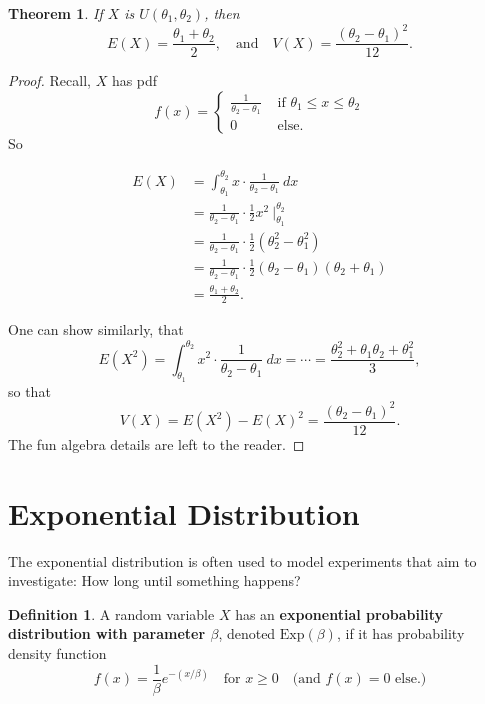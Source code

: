 \documentclass[
]{book}
\newtheorem{theorem}{Theorem}[chapter]
\theoremstyle{definition}
\newtheorem{definition}{Definition}[chapter]
\theoremstyle{definition}
\theoremstyle{definition}
\theoremstyle{definition}
\theoremstyle{remark}
\begin{document}
\begin{theorem}
\protect\hypertarget{thm:uniform-EandV}{}\label{thm:uniform-EandV}If \(X\) is \(U(\theta_1,\theta_2)\), then \[E(X) = \frac{\theta_1 + \theta_2}{2}, ~~~ \text{ and } ~~~ V(X) = \frac{(\theta_2-\theta_1)^2}{12}.\]
\end{theorem}

\begin{proof}
Recall, \(X\) has pdf
\[
f(x)=
\begin{cases}
\frac{1}{\theta_2 - \theta_1} &\text{ if }\theta_1 \leq x \leq \theta_2 \\
0 &\text{ else.} 
\end{cases}
\]
So

\begin{align*}
E(X) &= \int_{\theta_1}^{\theta_2} x \cdot \frac{1}{\theta_2-\theta_1}~dx\\
      &= \frac{1}{\theta_2-\theta_1} \cdot \frac{1}{2}x^2 ~\biggr|_{\theta_1}^{\theta_2}\\
      &= \frac{1}{\theta_2-\theta_1} \cdot \frac{1}{2}(\theta_2^2-\theta_1^2) \\
      &= \frac{1}{\theta_2-\theta_1} \cdot \frac{1}{2}(\theta_2-\theta_1)(\theta_2+\theta_1) \\
      &= \frac{\theta_1+\theta_2}{2}.
\end{align*}

One can show similarly, that \[E(X^2) = \int_{\theta_1}^{\theta_2} x^2 \cdot \frac{1}{\theta_2-\theta_1}~dx = \cdots =  \frac{\theta_2^2 + \theta_1\theta_2 + \theta_1^2}{3},\]
so that \[V(X) = E(X^2) - E(X)^2 = \frac{(\theta_2-\theta_1)^2}{12}.\] The fun algebra details are left to the reader.
\end{proof}

\section{Exponential Distribution}\label{exponential-distribution}

The exponential distribution is often used to model experiments that aim to investigate: How long until something happens?

\begin{definition}
\protect\hypertarget{def:exp-distribution}{}\label{def:exp-distribution}A random variable \(X\) has an \textbf{exponential probability distribution with parameter \(\beta\)}, denoted \(\text{Exp}(\beta)\), if it has probability density function
\[
f(x)=
\frac{1}{\beta}e^{-(x/\beta)} ~~~ \text{ for }x \geq 0~~~ \text{ (and }f(x) = 0\text{ else.)}
\]
\end{definition}
\end{document}
